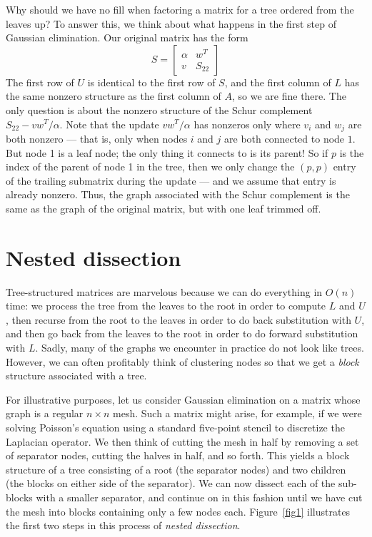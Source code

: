 \documentclass[12pt, leqno]{article}
\begin{document}
Why should we have no fill when factoring a matrix for a tree ordered
from the leaves up?  To answer this, we think about what happens in the
first step of Gaussian elimination.  Our original matrix has the form
\[
  S = \begin{bmatrix} \alpha & w^T \\ v & S_{22} \end{bmatrix}
\]
The first row of $U$ is identical to the first row of $S$, 
and the first column of $L$ has the same nonzero structure 
as the first column of $A$, so we are fine there.
The only question is about the nonzero structure of the Schur
complement $S_{22}-vw^T/\alpha$.  Note that the update $vw^T/\alpha$
has nonzeros only where $v_i$ and $w_j$ are both nonzero --- that is,
only when nodes $i$ and $j$ are both connected to node $1$.  But node
1 is a leaf node; the only thing it connects to is its parent!  So if
$p$ is the index of the parent of node 1 in the tree, then we only
change the $(p,p)$ entry of the trailing submatrix during the update
--- and we assume that entry is already nonzero.  Thus, the graph
associated with the Schur complement is the same as the graph of the
original matrix, but with one leaf trimmed off.

\section*{Nested dissection}

Tree-structured matrices are marvelous because we can do everything in
$O(n)$ time: we process the tree from the leaves to the root in order
to compute $L$ and $U$, then recurse from the root to the leaves in
order to do back substitution with $U$, and then go back from the
leaves to the root in order to do forward substitution with $L$.
Sadly, many of the graphs we encounter in practice do not look like trees.
However, we can often profitably think of clustering nodes so that we get
a {\em block} structure associated with a tree.

For illustrative purposes, let us consider Gaussian elimination on a
matrix whose graph is a regular $n \times n$ mesh.  Such a matrix
might arise, for example, if we were solving Poisson's equation using
a standard five-point stencil to discretize the Laplacian operator.
We then think of cutting the mesh in half by removing a set of
separator nodes, cutting the halves in half, and so forth.  This
yields a block structure of a tree consisting of a root (the separator
nodes) and two children (the blocks on either side of the separator).
We can now dissect each of the sub-blocks with a smaller separator,
and continue on in this fashion until we have cut the mesh into blocks
containing only a few nodes each.  Figure~\ref{fig1} illustrates the
first two steps in this process of {\em nested dissection}.
\end{document}
